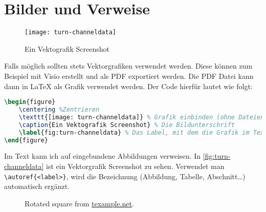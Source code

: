 \section{Bilder und Verweise}
\begin{figure}[ht]
	\centering
	\texttt{[image: turn-channeldata]}
	\caption{Ein Vektografik Screenshot}
	\label{fig:turn-channeldata}
\end{figure}

Falls möglich sollten stets Vektorgrafiken verwendet werden. Diese können zum Beispiel mit Visio erstellt und als PDF exportiert werden. Die PDF Datei kann dann in \LaTeX{} als Grafik verwendet werden. Der Code hierfür lautet wie folgt:

\begin{lstlisting}[language=latex,float]
\begin{figure}
	\centering %Zentrieren
	\texttt{[image: turn-channeldata]} % Grafik einbinden (ohne Dateiendung) und auf 85 % der Seitenbreite Skalieren
	\caption{Ein Vektografik Screenshot} % Die Bildunterschrift
	\label{fig:turn-channeldata} % Das Label, mit dem die Grafik im Text referenziert werden kann
\end{figure}
\end{lstlisting}

Im Text kann ich auf eingebundene Abbildungen verweisen. In \autoref{fig:turn-channeldata} ist ein Vektorgrafik Screenshot zu sehen. Verwendet man \verb|\autoref{<label>}|, wird die Bezeichnung (Abbildung, Tabelle, Abschnitt\dots) automatisch ergänzt.


\begin{figure}[ht]
	\setcounter{density}{20}
	\centering
	\caption{Rotated square from
		\href{http://www.texample.net/tikz/examples/rotated-polygons/}{texample.net}.}
	\label{fig:tikz1}
\end{figure}

